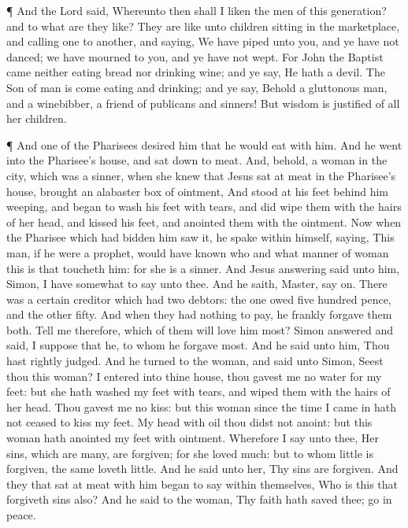  ¶ And the Lord said, Whereunto then shall I liken the men
of this generation? and to what are they like?  They are
like unto children sitting in the marketplace, and calling one to
another, and saying, We have piped unto you, and ye have not danced; we
have mourned to you, and ye have not wept.  For John the
Baptist came neither eating bread nor drinking wine; and ye say, He hath
a devil.  The Son of man is come eating and drinking; and
ye say, Behold a gluttonous man, and a winebibber, a friend of publicans
and sinners!  But wisdom is justified of all her children.

 ¶ And one of the Pharisees desired him that he would eat
with him. And he went into the Pharisee's house, and sat down to meat.
 And, behold, a woman in the city, which was a sinner, when
she knew that Jesus sat at meat in the Pharisee's house, brought an
alabaster box of ointment,  And stood at his feet behind
him weeping, and began to wash his feet with tears, and did wipe them
with the hairs of her head, and kissed his feet, and anointed them with
the ointment.  Now when the Pharisee which had bidden him
saw it, he spake within himself, saying, This man, if he were a prophet,
would have known who and what manner of woman this is that toucheth him:
for she is a sinner.  And Jesus answering said unto him,
Simon, I have somewhat to say unto thee. And he saith, Master, say on.
 There was a certain creditor which had two debtors: the
one owed five hundred pence, and the other fifty.  And when
they had nothing to pay, he frankly forgave them both. Tell me
therefore, which of them will love him most?  Simon
answered and said, I suppose that he, to whom he forgave most. And he
said unto him, Thou hast rightly judged.  And he turned to
the woman, and said unto Simon, Seest thou this woman? I entered into
thine house, thou gavest me no water for my feet: but she hath washed my
feet with tears, and wiped them with the hairs of her head.
 Thou gavest me no kiss: but this woman since the time I
came in hath not ceased to kiss my feet.  My head with oil
thou didst not anoint: but this woman hath anointed my feet with
ointment.  Wherefore I say unto thee, Her sins, which are
many, are forgiven; for she loved much: but to whom little is forgiven,
the same loveth little.  And he said unto her, Thy sins are
forgiven.  And they that sat at meat with him began to say
within themselves, Who is this that forgiveth sins also? 
And he said to the woman, Thy faith hath saved thee; go in peace.

